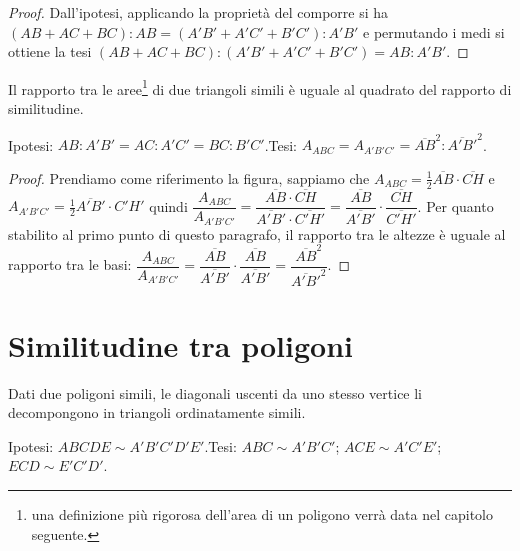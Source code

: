 \begin{proof}
Dall'ipotesi, applicando la proprietà del comporre si ha $(AB+AC+BC):AB=(A'B'+A'C'+B'C'):A'B'$ e permutando i medi si ottiene la tesi $(AB+AC+BC):(A'B'+A'C'+B'C')=AB:A'B'$.
\end{proof}

\begin{teorema}\label{teo:6.4}%
Il rapporto tra le aree\footnote{una definizione più rigorosa dell'area di un poligono verrà data nel capitolo seguente.} di due triangoli simili è uguale al quadrato del rapporto di similitudine.
\end{teorema}

\noindent Ipotesi: $AB:A'B'=AC:A'C'=BC:B'C'$.\tab Tesi: $A_{ABC}=A_{A'B'C'}=\overline{AB}^2:\overline{A'B'}^2$.

\begin{figure*}[!htb]
	\centering
\end{figure*}

\begin{proof}
Prendiamo come riferimento la figura, sappiamo che 
$A_{ABC}=\frac{1}{2}\overline{AB}\cdot\overline{CH}$ e $A_{A'B'C'}=\frac{1}{2}\overline{A'B'}\cdot{C'H'}$ quindi $\dfrac{A_{ABC}}{A_{A'B'C'}} = \dfrac{\overline{AB}\cdot\overline{CH}}{\overline{A'B'}\cdot\overline{C'H'}} = \dfrac{\overline{AB}}{\overline{A'B'}}\cdot \dfrac{\overline{CH}}{\overline{C'H'}}$.
Per quanto stabilito al primo punto di questo paragrafo, il rapporto tra le altezze è uguale al rapporto tra le basi: 
$\dfrac{A_{ABC}}{A_{A'B'C'}} = \dfrac{\overline{AB}}{\overline{A'B'}}\cdot \dfrac{\overline{AB}}{\overline{A'B'}} = \dfrac{\overline{AB}^2}{\overline{A'B'}^2}$.
\end{proof}


\section{Similitudine tra poligoni}

\begin{teorema}
Dati due poligoni simili, le diagonali uscenti da uno stesso vertice li decompongono in triangoli ordinatamente simili.
\end{teorema}

\noindent Ipotesi: $ABCDE\sim A'B'C'D'E'$.\tab Tesi: $ABC\sim A'B'C'$; $ACE\sim A'C'E'$; $ECD\sim E'C'D'$.

\begin{figure*}[!htb]
	\centering
\end{figure*}

